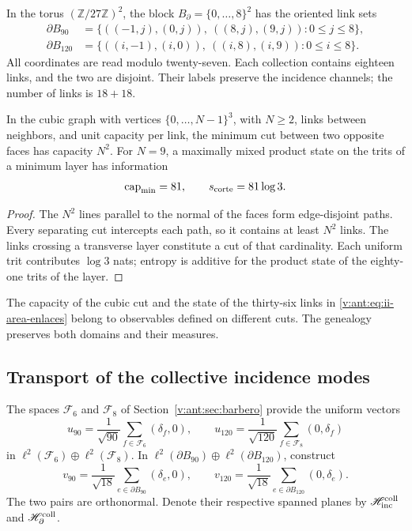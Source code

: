 In the torus \((\mathbb Z/27\mathbb Z)^2\), the block
\(B_\partial=\{0,\ldots,8\}^2\) has the oriented link sets
\begin{align}
 \partial B_{90}
 &=\{((-1,j),(0,j)),\ ((8,j),(9,j)):0\le j\le8\},\\
 \partial B_{120}
 &=\{((i,-1),(i,0)),\ ((i,8),(i,9)):0\le i\le8\}.
 \label{v:ant:eq:ii-area-enlaces}
\end{align}
All coordinates are read modulo twenty-seven. Each collection contains
eighteen links, and the two are disjoint. Their labels preserve the
incidence channels; the number of links is \(18+18\).

\begin{theorem}
\label{v:ant:thm:ii-area-corte-minimo}
In the cubic graph with vertices \(\{0,\ldots,N-1\}^3\), with
\(N\ge2\), links between neighbors, and unit capacity per link,
the minimum cut between two opposite faces has capacity \(N^2\).
For \(N=9\), a maximally mixed product state on the
trits of a minimum layer has information
\begin{equation}
 \operatorname{cap}_{\min}=81,\qquad s_{\rm corte}=81\log3.
 \label{v:ant:eq:ii-area-corte-informacion}
\end{equation}
\end{theorem}
\begin{proof}
The \(N^2\) lines parallel to the normal of the faces form edge-disjoint
paths. Every separating cut intercepts each path, so
it contains at least \(N^2\) links. The links crossing
a transverse layer constitute a cut of that cardinality. Each uniform trit
contributes \(\log3\) nats; entropy is additive for the product
state of the eighty-one trits of the layer.
\end{proof}

The capacity of the cubic cut and the state of the thirty-six links
in \eqref{v:ant:eq:ii-area-enlaces} belong to observables defined on
different cuts. The genealogy preserves both domains and their measures.

\subsection{Transport of the collective incidence modes}
\label{v:ant:sec:ii-area-transporte-colectivo}

The spaces \(\mathcal F_6\) and \(\mathcal F_8\) of
Section~\ref{v:ant:sec:barbero} provide the uniform vectors
\[
 u_{90}=\frac1{\sqrt{90}}\sum_{f\in\mathcal F_6}(\delta_f,0),
 \qquad
 u_{120}=\frac1{\sqrt{120}}\sum_{f\in\mathcal F_8}(0,\delta_f)
\]
in \(\ell^2(\mathcal F_6)\oplus\ell^2(\mathcal F_8)\).
In \(\ell^2(\partial B_{90})\oplus\ell^2(\partial B_{120})\),
construct
\[
 v_{90}=\frac1{\sqrt{18}}\sum_{e\in\partial B_{90}}(\delta_e,0),
 \qquad
 v_{120}=\frac1{\sqrt{18}}\sum_{e\in\partial B_{120}}(0,\delta_e).
\]
The two pairs are orthonormal. Denote their respective spanned planes
by \(\mathscr H_{\rm inc}^{\rm coll}\) and
\(\mathscr H_\partial^{\rm coll}\).

